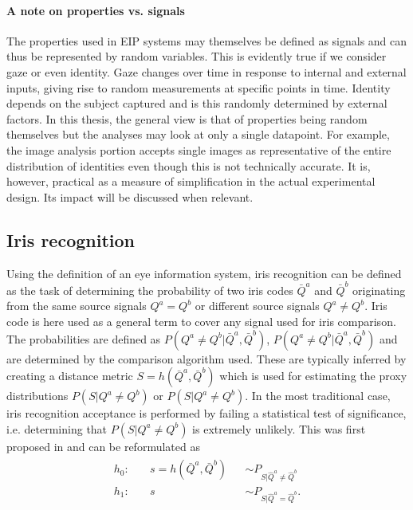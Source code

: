 \paragraph{A note on properties vs. signals}
The properties used in EIP systems may themselves be defined as signals and can thus be represented by random variables. This is evidently true if we consider gaze or even identity. Gaze changes over time in response to internal and external inputs, giving rise to random measurements at specific points in time. Identity depends on the subject captured and is this randomly determined by external factors. In this thesis, the general view is that of properties being random themselves but the analyses may look at only a single datapoint. For example, the image analysis portion accepts single images as representative of the entire distribution of identities even though this is not technically accurate. It is, however, practical as a measure of simplification in the actual experimental design. Its impact will be discussed when relevant.

\subsection{Iris recognition}
Using the definition of an eye information system, iris recognition can be defined as the task of determining the probability of two iris codes $\bar{Q}^a$ and $\bar{Q}^b$ originating from the same source signals $Q^a = Q^b$ or different source signals $Q^a\neq Q^b$. Iris code is here used as a general term to cover any signal used for iris comparison. The probabilities are defined as $P(Q^a\neq Q^b|\bar{Q}^a, \bar{Q}^b)$, $P(Q^a\neq Q^b|\bar{Q}^a, \bar{Q}^b)$ and are determined by the comparison algorithm used. These are typically inferred by creating a distance metric $S = h(\bar{Q}^a, \bar{Q}^b)$ which is used for estimating the proxy distributions $P(S|Q^a\neq Q^b)$ or $P(S|Q^a\neq Q^b)$. In the most traditional case, iris recognition acceptance is performed by failing a statistical test of significance, i.e. determining that $P(S|Q^a\neq Q^b)$ is extremely unlikely. This was first proposed in \cite{DAUGMAN_IRIS_ORIG} and can be reformulated as
\begin{align}
\begin{aligned}
    h_0: & \quad s = h(\bar{Q}^a, \bar{Q}^b) &&\sim  P_{S|\hat{Q}^a\neq \hat{Q}^b}\\
    h_1: & \quad s && \sim  P_{S|\hat{Q}^a = \hat{Q}^b}.
\end{aligned}
\end{align}

